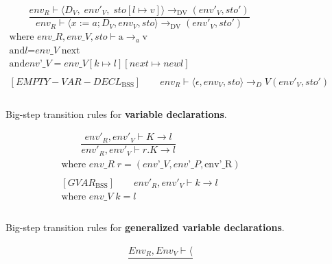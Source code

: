 \begin{figure}[htbp]
	\centering
	\begin{gather*}
		[VAR-DECL_\text{BSS}]
		\qquad 
		\dfrac
		{env_R \vdash \langle D_V,\; env'_V, \; sto[l \mapsto v] \rangle \rightarrow_\text{DV} (env'_V, sto')}
		{env_R \vdash \langle x:=a; D_V, env_V, sto \rangle \rightarrow_\text{DV} (env'_V, sto')} \\
		\text{where } \textit{env_R}, \textit{env_V}, \textit{sto} \vdash \text{a} \rightarrow_a \text{v} \\
		\text{and} \textit{l} = \textit{env_V} \; \text{next} \\
		\text{and} \textit{env'_V} = \textit{env_V}[k \mapsto l][next \mapsto new l]
		\\
		\\
		[EMPTY-VAR-DECL_\text{BSS}]
		\qquad env_R \vdash \langle \epsilon, env_V, sto \rangle \rightarrow_DV (env'_V, sto')
		\\
		\\
	\end{gather*}
	\caption{Big-step transition rules for \textbf{variable declarations}.}
	\label{fig:BssStm}
\end{figure}

\begin{figure}[htbp]
	\centering
	\begin{gather*}
		[GVAR_\text{BSS}]
		\qquad 
		\dfrac
		{env'_R, env'_V \vdash K \rightarrow \textit{l}}
		{env'_R, env'_V \vdash r.K \rightarrow \textit{l}} \\
		\text{where } \textit{env_R} \; r = (\textit{env'_V}, \textit{env'_P}, \text{env'_R})
		\\
		\\
		[GVAR_\text{BSS}]
		\qquad env'_R, env'_V \vdash k \rightarrow l \\
		\text{where } \textit{env_V} \; k = l
		\\
		\\
	\end{gather*}
	\caption{Big-step transition rules for \textbf{generalized variable declarations}.}
	\label{fig:BssStm}
\end{figure}

\begin{figure}[htbp]
	\centering
	\begin{gather*}
		[MEMBERACCESS_\text{BSS}]
		\qquad
		\dfrac{Env_R, Env_V \vdash \langle  }{}	
	\end{gather*}
	\caption{}
	\label{fig:BssStm}
\end{figure}


